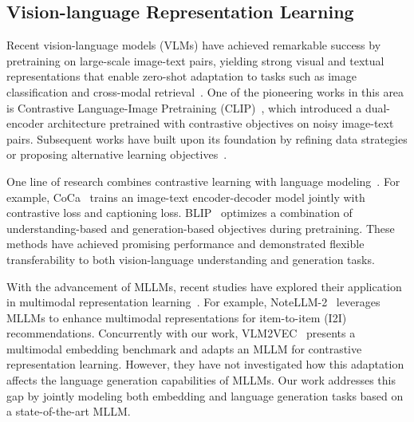 \subsection{Vision-language Representation Learning}
Recent vision-language models (VLMs) have achieved remarkable success by pretraining on large-scale image-text pairs, yielding strong visual and textual representations that enable zero-shot adaptation to tasks such as image classification and cross-modal retrieval~\citep{zhang2024rankclip, zhang2024vision, ghosh2024exploring}. 
%
One of the pioneering works in this area is Contrastive Language-Image Pretraining (CLIP)~\citep{radford2021learning}, which introduced a dual-encoder architecture pretrained with contrastive objectives on noisy image-text pairs. 
%
Subsequent works have built upon its foundation by refining data strategies or proposing alternative learning objectives~\citep{li2022blip,zhai2023sigmoid,li2023blip,cherti2023reproducible, zhao2024multimodal, zhang2024rankclip}. 

One line of research combines contrastive learning with language modeling~\citep{yu2022coca, li2023blip}. 
%
For example, CoCa~\citep{yu2022coca} trains an image-text encoder-decoder model jointly with contrastive loss and captioning loss. 
%
BLIP~\citep{li2023blip} optimizes a combination of understanding-based and generation-based objectives during pretraining. 
%
These methods have achieved promising performance and demonstrated flexible transferability to both vision-language understanding and generation tasks.
%

With the advancement of MLLMs, recent studies have explored their application in multimodal representation learning~\citep{zhang2024notellm,jiang2024e5,jiang2024vlm2vec}.
%
For example, NoteLLM-2~\citep{zhang2024notellm} leverages MLLMs to enhance multimodal representations for item-to-item (I2I) recommendations. 
%
Concurrently with our work, VLM2VEC~\citep{jiang2024vlm2vec} presents a multimodal embedding benchmark and adapts an MLLM for contrastive representation learning. 
%
However, they have not investigated how this adaptation affects the language generation capabilities of MLLMs. 
%
Our work addresses this gap by jointly modeling both embedding and language generation tasks based on a state-of-the-art MLLM.
%